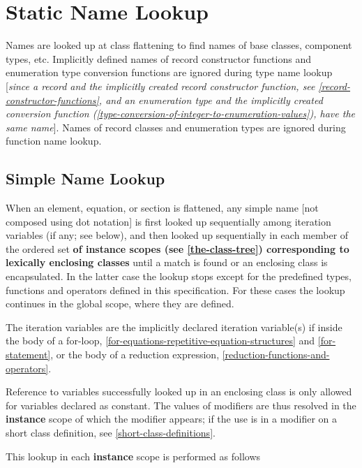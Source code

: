 \section{Static Name Lookup}

Names are looked up at class flattening to find names of base classes,
component types, etc. Implicitly defined names of record constructor
functions and enumeration type conversion functions are ignored during
type name lookup {[}\emph{since a record and the implicitly created
record constructor function, see \autoref{record-constructor-functions}, and an
enumeration type and the implicitly created conversion function
(\autoref{type-conversion-of-integer-to-enumeration-values}), have the same name}{]}. Names of record
classes and enumeration types are ignored during function name lookup.

\subsection{Simple Name Lookup}


When an element, equation, or section is flattened, any simple name
  {[}not composed using dot notation{]} is first looked up sequentially among
iteration variables (if any; see below), and then looked up sequentially in each
member of the ordered set \textbf{of instance scopes (see
\autoref{the-class-tree}) corresponding to lexically enclosing classes} until a
match is found or an enclosing class is encapsulated. In the latter case
the lookup stops except for the predefined types, functions and
operators defined in this specification. For these cases the lookup continues in the global scope, where they are defined.

The iteration variables are the implicitly declared iteration variable(s) if inside
the body of a for-loop, \autoref{for-equations-repetitive-equation-structures} and \autoref{for-statement},
or the body of a reduction expression, \autoref{reduction-functions-and-operators}.

Reference to variables successfully looked up in an enclosing class is
only allowed for variables declared as constant. The values of modifiers
are thus resolved in the \textbf{instance} scope of which the modifier
appears; if the use is in a modifier on a short class definition, see \autoref{short-class-definitions}.

This lookup in each \textbf{instance} scope is performed as follows

